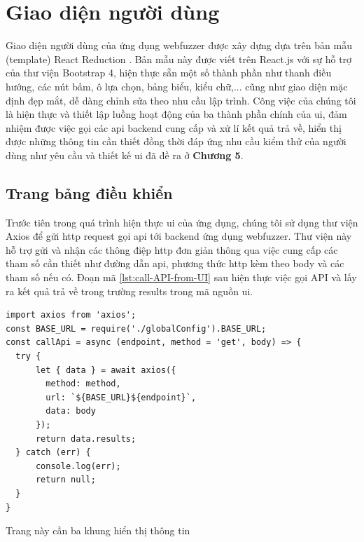 \section{Giao diện người dùng}
Giao diện người dùng của ứng dụng webfuzzer được xây dựng dựa trên bản mẫu (template) React Reduction \parencite{react-reduction-github}. Bản mẫu này được viết trên React.js với sự hỗ trợ của thư viện Bootstrap 4, hiện thực sẵn một số thành phần như thanh điều hướng, các nút bấm, ô lựa chọn, bảng biểu, kiểu chữ,... cũng như giao diện mặc định đẹp mắt, dễ dàng chỉnh sửa theo nhu cầu lập trình. Công việc của chúng tôi là hiện thực và thiết lập luồng hoạt động của ba thành phần chính của \acrshort{ui}, đảm nhiệm được việc gọi các \acrshort{api} backend cung cấp và xử lí kết quả trả về, hiển thị được những thông tin cần thiết đồng thời đáp ứng nhu cầu kiểm thử của người dùng như yêu cầu và thiết kế \acrshort{ui} đã đề ra ở \textbf{Chương 5}.
\subsection{Trang bảng điều khiển}
Trước tiên trong quá trình hiện thực \acrshort{ui} của ứng dụng, chúng tôi sử dụng thư viện Axios \parencite{axios-npm} để gửi \acrshort{http} request gọi \acrshort{api} tới backend ứng dụng webfuzzer. Thư viện này hỗ trợ gửi và nhận các thông điệp \acrshort{http} đơn giản thông qua việc cung cấp các tham số cần thiết như đường dẫn \acrshort{api}, phương thức \acrshort{http} kèm theo body và các tham số nếu có. Đoạn mã \ref{lst:call-API-from-UI} sau hiện thực việc gọi API và lấy ra kết quả trả về trong trường \acrshort{results} trong mã nguồn \acrshort{ui}.
\begin{lstlisting}[style=ES6, label={lst:call-API-from-UI}, caption={Gọi API từ mã nguồn UI}]
import axios from 'axios';
const BASE_URL = require('./globalConfig').BASE_URL;
const callApi = async (endpoint, method = 'get', body) => {
  try {
      let { data } = await axios({
        method: method,
        url: `${BASE_URL}${endpoint}`,
        data: body
      });
      return data.results;
  } catch (err) {
      console.log(err);
      return null;
  }
}
\end{lstlisting}
Trang này cần ba khung hiển thị thông tin 
